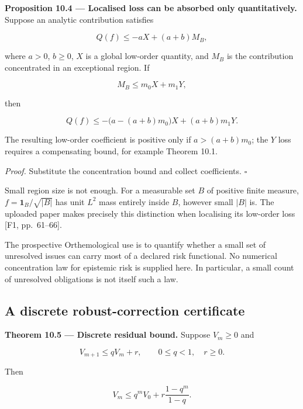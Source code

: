 \documentclass[11pt,a4paper]{article}
\begin{document}

\textbf{Proposition 10.4 --- Localised loss can be absorbed only
quantitatively.} Suppose an analytic contribution satisfies

\nopagebreak[4]

\[Q(f)\leq-aX+(a+b)M_B,\]

where \(a>0\), \(b\geq0\), \(X\) is a global low-order quantity, and
\(M_B\) is the contribution concentrated in an exceptional region. If

\nopagebreak[4]

\[M_B\leq m_0X+m_1Y,\]

then

\nopagebreak[4]

\[Q(f)\leq-\bigl(a-(a+b)m_0\bigr)X+(a+b)m_1Y.\]

The resulting low-order coefficient is positive only if \(a>(a+b)m_0\);
the \(Y\) loss requires a compensating bound, for example Theorem 10.1.

\emph{Proof.} Substitute the concentration bound and collect
coefficients. \(\square\)

Small region size is not enough. For a measurable set \(B\) of positive
finite measure, \(f=\mathbf1_B/\sqrt{|B|}\) has unit \(L^2\) mass
entirely inside \(B\), however small \(|B|\) is. The uploaded paper
makes precisely this distinction when localising its low-order loss
{[}F1, pp.~61--66{]}.

The prospective Orthemological use is to quantify whether a small set of
unresolved issues can carry most of a declared risk functional. No
numerical concentration law for epistemic risk is supplied here. In
particular, a small count of unresolved obligations is not itself such a
law.

\subsection{A discrete robust-correction
certificate}\label{a-discrete-robust-correction-certificate}


\textbf{Theorem 10.5 --- Discrete residual bound.} Suppose \(V_m\geq0\)
and

\nopagebreak[4]

\[V_{m+1}\leq qV_m+r,\qquad 0\leq q<1,\quad r\geq0.\]

Then

\nopagebreak[4]

\[V_m\leq q^mV_0+r\frac{1-q^m}{1-q}.\]
\end{document}
